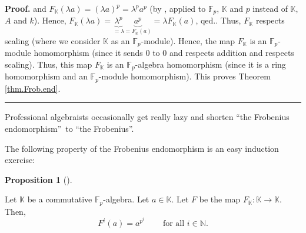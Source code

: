 \documentclass[numbers=enddot,12pt,final,onecolumn,notitlepage]{scrartcl}%
\newcounter{exer}
\theoremstyle{definition}
\newtheorem{prop}[theo]{Proposition}
\newenvironment{proposition}[1][]
{\begin{prop}[#1]\begin{leftbar}}
{\end{leftbar}\end{prop}}
\newenvironment{proof}[1][Proof]{\noindent\textbf{#1.} }{\ \rule{0.5em}{0.5em}}
\begin{document}
\begin{proof}
{and $F_{\mathbb{K}}\left(  \lambda a\right)  =\left(  \lambda a\right)
^{p}=\lambda^{p}a^{p}$ (by \cite[Proposition 6.9.7 \textbf{(b)}]{19s}, applied
to $\mathbb{F}_{p}$, $\mathbb{K}$ and $p$ instead of $\mathbb{K}$, $A$ and
$k$). Hence, $F_{\mathbb{K}}\left(  \lambda a\right)  =\underbrace{\lambda
^{p}}_{=\lambda}\underbrace{a^{p}}_{=F_{\mathbb{K}}\left(  a\right)  }=\lambda
F_{\mathbb{K}}\left(  a\right)  $, qed.}. Thus, $F_{\mathbb{K}}$ respects
scaling (where we consider $\mathbb{K}$ as an $\mathbb{F}_{p}$-module). Hence,
the map $F_{\mathbb{K}}$ is an $\mathbb{F}_{p}$-module homomorphism (since it
sends $0$ to $0$ and respects addition and respects scaling). Thus, this map
$F_{\mathbb{K}}$ is an $\mathbb{F}_{p}$-algebra homomorphism (since it is a
ring homomorphism and an $\mathbb{F}_{p}$-module homomorphism). This proves
Theorem \ref{thm.Frob.end}.
\end{proof}

Professional algebraists occasionally get really lazy and shorten
\textquotedblleft the Frobenius endomorphism\textquotedblright\ to
\textquotedblleft the Frobenius\textquotedblright.

The following property of the Frobenius endomorphism is an easy induction exercise:

\begin{proposition}
\label{prop.Frob.power}Let $\mathbb{K}$ be a commutative $\mathbb{F}_{p}%
$-algebra. Let $a\in\mathbb{K}$. Let $F$ be the map $F_{\mathbb{K}}%
:\mathbb{K}\rightarrow\mathbb{K}$. Then,%
\begin{equation}
F^{i}\left(  a\right)  =a^{p^{i}}\ \ \ \ \ \ \ \ \ \ \text{for all }%
i\in\mathbb{N}. \label{eq.prop.Frob.power.claim}%
\end{equation}

\end{proposition}
\end{document}
